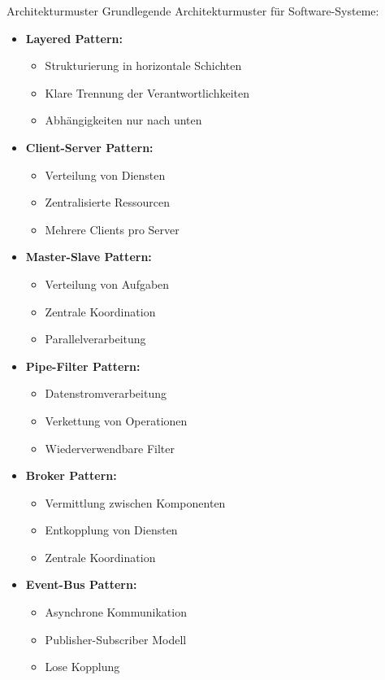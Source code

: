 \begin{concept}{Architekturmuster}
Grundlegende Architekturmuster für Software-Systeme:

\begin{itemize}
    \item \textbf{Layered Pattern:} 
    \begin{itemize}
        \item Strukturierung in horizontale Schichten
        \item Klare Trennung der Verantwortlichkeiten
        \item Abhängigkeiten nur nach unten
    \end{itemize}
    
    \item \textbf{Client-Server Pattern:}
    \begin{itemize}
        \item Verteilung von Diensten
        \item Zentralisierte Ressourcen
        \item Mehrere Clients pro Server
    \end{itemize}
    
    \item \textbf{Master-Slave Pattern:}
    \begin{itemize}
        \item Verteilung von Aufgaben
        \item Zentrale Koordination
        \item Parallelverarbeitung
    \end{itemize}
    
    \item \textbf{Pipe-Filter Pattern:}
    \begin{itemize}
        \item Datenstromverarbeitung
        \item Verkettung von Operationen
        \item Wiederverwendbare Filter
    \end{itemize}
    
    \item \textbf{Broker Pattern:}
    \begin{itemize}
        \item Vermittlung zwischen Komponenten
        \item Entkopplung von Diensten
        \item Zentrale Koordination
    \end{itemize}
    
    \item \textbf{Event-Bus Pattern:}
    \begin{itemize}
        \item Asynchrone Kommunikation
        \item Publisher-Subscriber Modell
        \item Lose Kopplung
    \end{itemize}
\end{itemize}
\end{concept}

